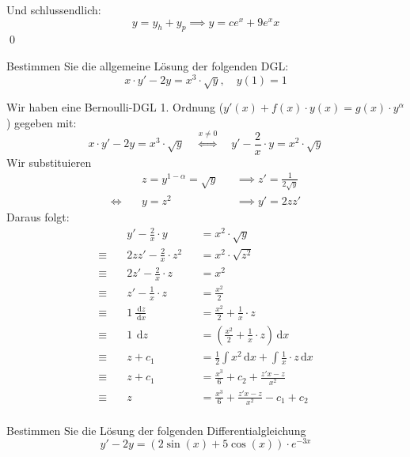 \documentclass[answers]{exam}
\renewcommand{\d}{\,\mathrm{d}}
\begin{document}
\begin{questions}
\begin{parts}
\begin{solution}
            Und schlussendlich:
            $$
                y = y_h + y_p \implies y = ce^x + 9e^xx
            $$\qed
        \end{solution}
    \end{parts}

    \newpage
    \question
    Bestimmen Sie die allgemeine Lösung der folgenden DGL:
    $$
        x \cdot y'-2y = x^3 \cdot \sqrt{y}, \quad y(1) = 1
    $$
    \begin{solution}
        Wir haben eine Bernoulli-DGL 1. Ordnung ($y'(x) + f(x) \cdot y(x) = g(x) \cdot y^\alpha$) gegeben mit:
        $$
            x \cdot y'-2y = x^3 \cdot \sqrt{y} \quad \overset{x\neq 0}{\iff} \quad  y' - \frac{2}{x} \cdot y = x^2 \cdot \sqrt{y}
        $$
        Wir substituieren
        $$
            \begin{aligned}
                           & z = y^{1-\alpha} = \sqrt{y} &  & \implies z' = \frac{1}{2\sqrt{y}} \\
                \iff \quad & y = z^2                     &  & \implies y' = 2zz'
            \end{aligned}
        $$
        Daraus folgt:
        $$
            \begin{aligned}
                             & y' - \frac{2}{x} \cdot y     &  & = x^2 \cdot \sqrt{y}                                         \\
                \equiv \quad & 2zz' - \frac{2}{x} \cdot z^2 &  & = x^2 \cdot \sqrt{z^2}                                       \\
                \equiv \quad & 2z' - \frac{2}{x} \cdot z    &  & = x^2                                                        \\
                \equiv \quad & z' - \frac{1}{x} \cdot z     &  & = \frac{x^2}{2}                                              \\
                \equiv \quad & 1 \ \frac{\d z}{\d x}        &  & = \frac{x^2}{2} + \frac{1}{x} \cdot z                        \\
                \equiv \quad & 1 \ \d z                     &  & = \left(\frac{x^2}{2} + \frac{1}{x} \cdot z \right) \d x     \\
                \equiv \quad & z + c_1                      &  & = \frac{1}{2} \int x^2 \d x +  \int \frac{1}{x} \cdot z \d x \\
                \equiv \quad & z + c_1                      &  & = \frac{x^3}{6} + c_2 +  \frac{z'x - z}{x^2}                 \\
                \equiv \quad & z                            &  & = \frac{x^3}{6}  +  \frac{z'x - z}{x^2} - c_1 + c_2          \\
            \end{aligned}
        $$
    \end{solution}

    \newpage
    \question
    Bestimmen Sie die Lösung der folgenden Differentialgleichung
    $$
        y' - 2y = (2\sin(x) + 5\cos(x)) \cdot e^{-3x}
    $$
    \begin{solution}

    \end{solution}
\end{questions}
\end{document}
